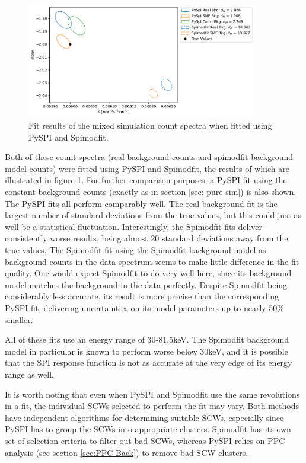 \documentclass{report}
\begin{document}
\begin{figure}[h]
  \centering
  \includegraphics[width=0.9\textwidth]{Images/SMF_Comparison/spimodfit_comparison_combined_plot.pdf}
  \caption{Fit results of the mixed simulation count spectra when fitted using PySPI and Spimodfit. }
  \label{fig smf comparison}
\end{figure}

Both of these count spectra (real background counts and spimodfit background model counts) were fitted using PySPI and Spimodfit, the results of which are illustrated in figure \ref{fig smf comparison}. For further comparison purposes, a PySPI fit using the constant background counts (exactly as in section \ref{sec: pure sim}) is also shown. The PySPI fits all perform comparably well. The real background fit is the largest number of standard deviations from the true values, but this could just as well be a statistical fluctuation. Interestingly, the Spimodfit fits deliver consistently worse results, being almost 20 standard deviations away from the true values. The Spimodfit fit using the Spimodfit background model as background counts in the data spectrum seems to make little difference in the fit quality. One would expect Spimodfit to do very well here, since its background model matches the background in the data perfectly. Despite Spimodfit being considerably less accurate, its result is more precise than the corresponding PySPI fit, delivering uncertainties on its model parameters up to nearly 50\% smaller. 

All of these fits use an energy range of 30-81.5keV. The Spimodfit background model in particular is known to perform worse below 30keV, and it is possible that the SPI response function is not as accurate at the very edge of its energy range as well.


It is worth noting that even when PySPI and Spimodfit use the same revolutions in a fit, the individual SCWs selected to perform the fit may vary. Both methods have independent algorithms for determining suitable SCWs, especially since PySPI has to group the SCWs into appropriate clusters. Spimodfit has its own set of selection criteria to filter out bad SCWs, whereas PySPI relies on PPC analysis (see section \ref{sec:PPC Back}) to remove bad SCW clusters. 
\end{document}
